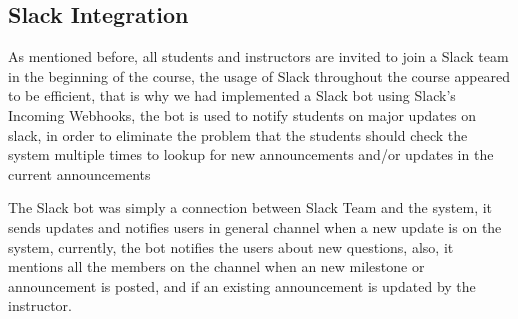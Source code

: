 \subsection{Slack\texttrademark{} Integration}
\label{sub:slack}
As mentioned before, all students and instructors are invited to join a Slack\texttrademark{} team in the beginning of the course,
the usage of Slack\texttrademark{} throughout the course appeared to be efficient, that is why we had implemented a Slack\texttrademark{} bot using
Slack\texttrademark{}'s Incoming Webhooks, the bot is used to notify students on major updates on slack, in order to eliminate the
problem that the students should check the system multiple times to lookup for new announcements and/or updates in the current announcements

\newParagraph
The Slack\texttrademark{} bot was simply a connection between Slack\texttrademark{} Team and the system, it sends updates and notifies
users in general channel when a new update is on the system, currently, the bot notifies the users about new questions, also, it mentions all
the members on the channel when an new milestone or announcement is posted, and if an existing announcement is updated by the instructor.

